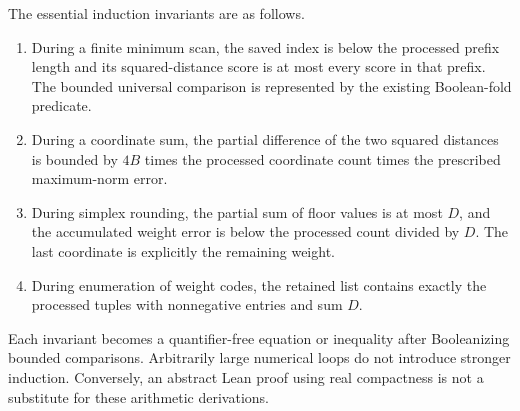 The essential induction invariants are as follows.
\begin{enumerate}
\item During a finite minimum scan, the saved index is below the processed
      prefix length and its squared-distance score is at most every score
      in that prefix.  The bounded universal comparison is represented by
      the existing Boolean-fold predicate.
\item During a coordinate sum, the partial difference of the two squared
      distances is bounded by \(4B\) times the processed coordinate count
      times the prescribed maximum-norm error.
\item During simplex rounding, the partial sum of floor values is at most
      \(D\), and the accumulated weight error is below the processed
      count divided by \(D\).  The last coordinate is explicitly the
      remaining weight.
\item During enumeration of weight codes, the retained list contains
      exactly the processed tuples with nonnegative entries and sum \(D\).
\end{enumerate}
Each invariant becomes a quantifier-free equation or inequality after
Booleanizing bounded comparisons.  Arbitrarily large numerical loops do
not introduce stronger induction.  Conversely, an abstract Lean proof
using real compactness is not a substitute for these arithmetic
derivations.

